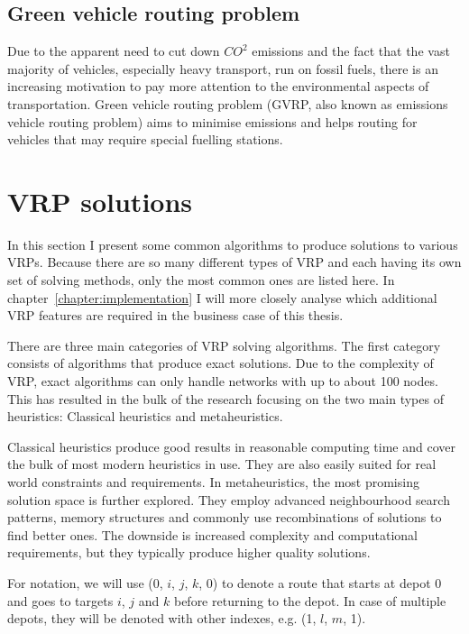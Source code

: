 \subsection{Green vehicle routing problem}

Due to the apparent need to cut down $CO^2$ emissions and the fact that the vast majority of vehicles, especially heavy transport, run on fossil fuels, there is an increasing motivation to pay more attention to the environmental aspects of transportation. Green vehicle routing problem (GVRP, also known as emissions vehicle routing problem) aims to minimise emissions and helps routing for vehicles that may require special fuelling stations. \cite{erdougan2012green}



\section{VRP solutions}

In this section I present some common algorithms to produce solutions to various VRPs. Because there are so many different types of VRP and each having its own set of solving methods, only the most common ones are listed here. In chapter~\ref{chapter:implementation} I will more closely analyse which additional VRP features are required in the business case of this thesis. 

There are three main categories of VRP solving algorithms. The first category consists of algorithms that produce exact solutions. Due to the complexity of VRP, exact algorithms can only handle networks with up to about 100 nodes. This has resulted in the bulk of the research focusing on the two main types of heuristics: Classical heuristics and metaheuristics. \cite{laporte2007you}  

Classical heuristics produce good results in reasonable computing time and cover the bulk of most modern heuristics in use. They are also easily suited for real world constraints and requirements. In metaheuristics, the most promising solution space is further explored. They employ advanced neighbourhood search patterns, memory structures and commonly use recombinations of solutions to find better ones. The downside is increased complexity and computational requirements, but they typically produce higher quality solutions. \cite{laporte2000classical}

For notation, we will use (0, $i$, $j$, $k$, 0) to denote a route that starts at depot 0 and goes to targets $i$, $j$ and $k$ before returning to the depot. In case of multiple depots, they will be denoted with other indexes, e.g. (1, $l$, $m$, 1).

